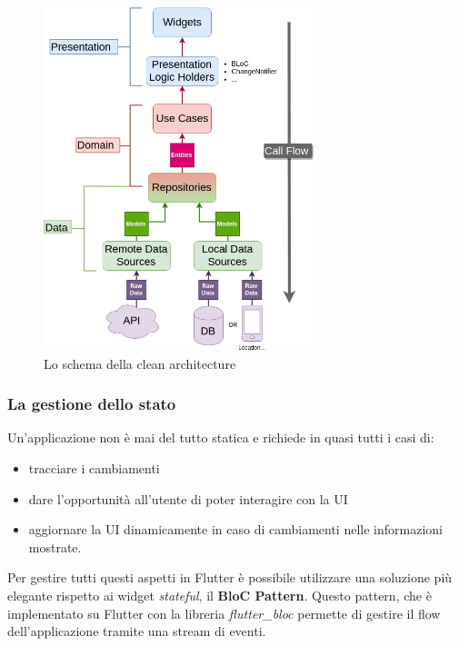 \documentclass[12pt]{article}
\begin{document}
\begin{center}
\begin{figure}[htp]
    \centering
    \includegraphics[height=10cm]{diagrams/clean_architecture.png}
    \caption{Lo schema della clean architecture}
    \label{fig:clean_architecture}
\end{figure}
\end{center}

\subsubsection{La gestione dello stato}
Un’applicazione non è mai del tutto statica e richiede in quasi tutti i casi di:
\begin{itemize}
	\item tracciare i cambiamenti
	\item dare l’opportunità all’utente di poter interagire con la UI
	\item aggiornare la UI dinamicamente in caso di cambiamenti nelle informazioni mostrate.
\end{itemize}
Per gestire tutti questi aspetti in Flutter è possibile utilizzare una soluzione più elegante rispetto ai widget \emph{stateful}, il \textbf{BloC Pattern}. Questo pattern, che è implementato su Flutter con la libreria \emph{flutter\_bloc} permette di gestire il flow dell'applicazione tramite una stream di eventi. 
\end{document}

